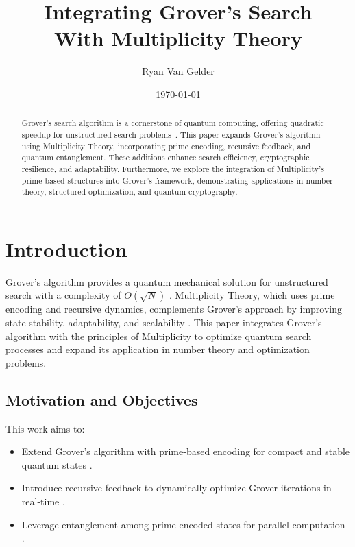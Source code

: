 \documentclass{article}
\theoremstyle{plain}
\begin{document}
\title{Integrating Grover's Search\\ With Multiplicity Theory}
\author{Ryan Van Gelder}
\date{\today}

\maketitle

\begin{abstract}
Grover's search algorithm is a cornerstone of quantum computing, offering quadratic speedup for unstructured search problems~\cite{grover1996}. This paper expands Grover’s algorithm using Multiplicity Theory, incorporating prime encoding, recursive feedback, and quantum entanglement. These additions enhance search efficiency, cryptographic resilience, and adaptability. Furthermore, we explore the integration of Multiplicity’s prime-based structures into Grover’s framework, demonstrating applications in number theory, structured optimization, and quantum cryptography.
\end{abstract}

\section{Introduction}
Grover’s algorithm provides a quantum mechanical solution for unstructured search with a complexity of \(O(\sqrt{N})\) \cite{grover1996}. Multiplicity Theory, which uses prime encoding and recursive dynamics, complements Grover’s approach by improving state stability, adaptability, and scalability \cite{berkowitz2021}. This paper integrates Grover's algorithm with the principles of Multiplicity to optimize quantum search processes and expand its application in number theory and optimization problems.

\subsection{Motivation and Objectives}
This work aims to:
\begin{itemize}
    \item Extend Grover’s algorithm with prime-based encoding for compact and stable quantum states \citep{hardy1916}.
    \item Introduce recursive feedback to dynamically optimize Grover iterations in real-time \citep{childs2010}.
    \item Leverage entanglement among prime-encoded states for parallel computation \citep{ricks2004}.
\end{itemize}
\end{document}
